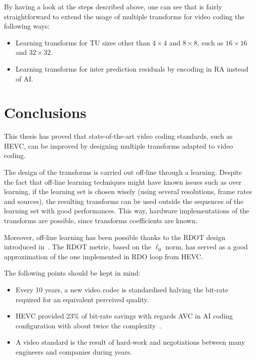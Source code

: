 \documentclass[11pt,a4paper,openright,twoside]{book}
\numberwithin{equation}{section} %
\numberwithin{figure}{section} %
\numberwithin{table}{section} %
\begin{document}
By having a look at the steps described above, one can see that is fairly
straightforward to extend the usage of multiple transforms for video coding
the following ways:
\begin{itemize}
	\item Learning transforms for \ac{TU} sizes other than $4\times4$ and
		$8\times8$, such as $16\times16$ and $32\times32$.
	\item Learning transforms for inter prediction residuals by encoding in
		\ac{RA} instead of \ac{AI}.
\end{itemize}

\section*{Conclusions}
\label{sec:final_conclusions}

This thesis has proved that state-of-the-art video coding standards, such as
\ac{HEVC}, can be improved by designing multiple transforms adapted to video
coding.

The design of the transforms is carried out off-line through a learning.
Despite the fact that off-line learning techniques might have known issues
such as over learning, if the learning set is chosen wisely (using several
resolutions, frame rates and sources), the resulting transforms can be used
outside the sequences of the learning set with good performances.
This way, hardware implementations of the transforms are possible, since
transforms coefficients are known.

Moreover, off-line learning has been possible thanks to the \ac{RDOT} design
introduced in~\cite{sezer-08-sparse-orthonormal-transforms}.
The \ac{RDOT} metric, based on the $\ell_0$ norm, has served as a good
approximation of the one implemented in \ac{RDO} loop  from \ac{HEVC}.

The following points should be kept in mind:
\begin{itemize}
	\item Every 10 years, a new video codec is standardised halving the
		bit-rate required for an equivalent perceived quality.
	\item \acs{HEVC} provided 23\% of bit-rate savings with regards \acs{AVC}
		in \acs{AI} coding configuration with about twice the
		complexity~\cite{JCTVC-M0329}.
	\item A video standard is the result of hard-work and negotiations between
		many engineers and companies during years.
\end{itemize}
\end{document}
